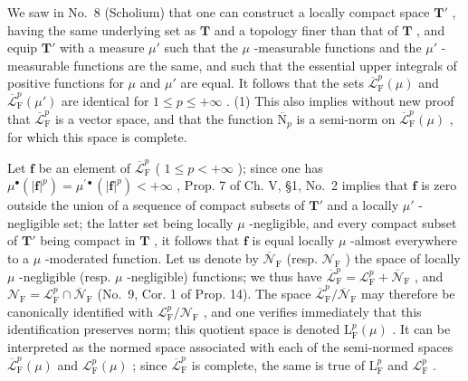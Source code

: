 We saw in No.~8 (Scholium) that one can construct a locally compact space \(\mathbf{T}'\) , having the same underlying set as \(\mathbf{T}\) and a topology finer than that of \(\mathbf{T}\) , and equip \(\mathbf{T}'\) with a measure \(\mu'\) such that the \(\mu\) -measurable functions and the \(\mu'\) -measurable functions are the same, and such that the essential upper integrals of positive functions for \(\mu\) and \(\mu'\) are equal. It follows that the sets \(\overline{\mathcal{L}}_{\mathrm{F}}^{p}(\mu)\) and \(\overline{\mathcal{L}}_{\mathrm{F}}^{p}(\mu')\) are identical for \(1 \leqslant p \leqslant +\infty\) . (1) This also implies without new proof that \(\overline{\mathcal{L}}_{\mathrm{F}}^{p}\) is a vector space, and that the function \(\overline{\mathrm{N}}_p\) is a semi-norm on \(\overline{\mathcal{L}}_{\mathrm{F}}^{p}(\mu)\) , for which this space is complete.

Let \(\mathbf{f}\) be an element of \(\overline{\mathcal{L}}_{\mathrm{F}}^{p}\) ( \(1 \leqslant p < +\infty\) ); since one has \(\mu^{\bullet}(|\mathbf{f}|^{p}) = \mu^{\prime \bullet}(|\mathbf{f}|^{p}) < +\infty\) , Prop. 7 of Ch. V, §1, No.~2 implies that \(\mathbf{f}\) is zero outside the union of a sequence of compact subsets of \(\mathbf{T}'\) and a locally \(\mu'\) -negligible set; the latter set being locally \(\mu\) -negligible, and every compact subset of \(\mathbf{T}'\) being compact in \(\mathbf{T}\) , it follows that \(\mathbf{f}\) is equal locally \(\mu\) -almost everywhere to a \(\mu\) -moderated function. Let us denote by \(\overline{\mathcal{N}}_{\mathrm{F}}\) (resp. \(\mathcal{N}_{\mathrm{F}}\) ) the space of locally \(\mu\) -negligible (resp. \(\mu\) -negligible) functions; we thus have \(\overline{\mathcal{L}}_{\mathrm{F}}^{p} = \mathcal{L}_{\mathrm{F}}^{p} + \overline{\mathcal{N}}_{\mathrm{F}}\) , and \(\mathcal{N}_{\mathrm{F}} = \mathcal{L}_{\mathrm{F}}^{p} \cap \overline{\mathcal{N}}_{\mathrm{F}}\) (No.~9, Cor. 1 of Prop. 14). The space \(\overline{\mathcal{L}}_{\mathrm{F}}^{p} / \overline{\mathcal{N}}_{\mathrm{F}}\) may therefore be canonically identified with \(\mathcal{L}_{\mathrm{F}}^{p} / \mathcal{N}_{\mathrm{F}}\) , and one verifies immediately that this identification preserves norm; this quotient space is denoted \(\mathrm{L}_{\mathrm{F}}^{p}(\mu)\) . It can be interpreted as the normed space associated with each of the semi-normed spaces \(\overline{\mathcal{L}}_{\mathrm{F}}^{p}(\mu)\) and \(\mathcal{L}_{\mathrm{F}}^{p}(\mu)\) ; since \(\overline{\mathcal{L}}_{\mathrm{F}}^{p}\) is complete, the same is true of \(\mathrm{L}_{\mathrm{F}}^{p}\) and \(\mathcal{L}_{\mathrm{F}}^{p}\) .

